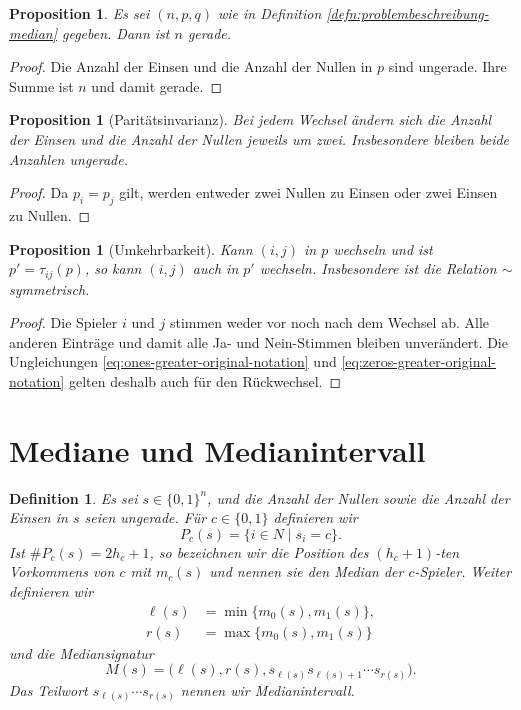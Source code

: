 \documentclass[12pt]{article}
\newtheorem{defn}[thm]{Definition}
\newtheorem{prop}[thm]{Proposition}
\begin{document}
\begin{prop}
Es sei $(n,p,q)$ wie in Definition
\ref{defn:problembeschreibung-median} gegeben. Dann ist $n$ gerade.
\end{prop}

\begin{proof}
Die Anzahl der Einsen und die Anzahl der Nullen in $p$ sind ungerade. Ihre
Summe ist $n$ und damit gerade.
\end{proof}

\begin{prop}[Paritätsinvarianz]
Bei jedem Wechsel ändern sich die Anzahl der Einsen und die Anzahl der Nullen
jeweils um zwei. Insbesondere bleiben beide Anzahlen ungerade.
\label{prop:paritaet-median}
\end{prop}

\begin{proof}
Da $p_i=p_j$ gilt, werden entweder zwei Nullen zu Einsen oder zwei Einsen zu
Nullen.
\end{proof}

\begin{prop}[Umkehrbarkeit]
Kann $(i,j)$ in $p$ wechseln und ist $p'=\tau_{ij}(p)$, so kann $(i,j)$ auch
in $p'$ wechseln. Insbesondere ist die Relation $\sim$ symmetrisch.
\label{prop:umkehrbar-median}
\end{prop}

\begin{proof}
Die Spieler $i$ und $j$ stimmen weder vor noch nach dem Wechsel ab. Alle
anderen Einträge und damit alle Ja- und Nein-Stimmen bleiben unverändert.
Die Ungleichungen
\eqref{eq:ones-greater-original-notation} und
\eqref{eq:zeros-greater-original-notation} gelten deshalb auch für den
Rückwechsel.
\end{proof}

\section{Mediane und Medianintervall}

\begin{defn}
Es sei $s\in\{0,1\}^n$, und die Anzahl der Nullen sowie die Anzahl der Einsen
in $s$ seien ungerade. Für $c\in\{0,1\}$ definieren wir
\[
P_c(s)=\{i\in N\mid s_i=c\}.
\]
Ist $\#P_c(s)=2h_c+1$, so bezeichnen wir die Position des $(h_c+1)$-ten
Vorkommens von $c$ mit $m_c(s)$ und nennen sie den Median der $c$-Spieler.
Weiter definieren wir
\begin{align*}
\ell(s)&=\min\{m_0(s),m_1(s)\},\\
r(s)&=\max\{m_0(s),m_1(s)\}
\end{align*}
und die Mediansignatur
\[
M(s)=\bigl(\ell(s),r(s),s_{\ell(s)}s_{\ell(s)+1}\cdots s_{r(s)}\bigr).
\]
Das Teilwort $s_{\ell(s)}\cdots s_{r(s)}$ nennen wir Medianintervall.
\end{defn}
\end{document}
